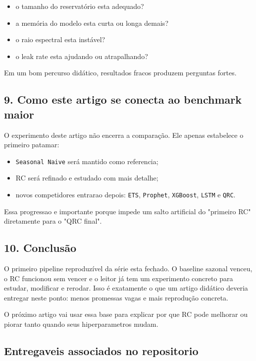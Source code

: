 \documentclass[12pt]{article}
\providecommand{\tightlist}{%
          \setlength{\itemsep}{0pt}\setlength{\parskip}{0pt}}
\begin{document}
\begin{itemize}
\tightlist
\item
  o tamanho do reservatório esta adequado?
\item
  a memória do modelo esta curta ou longa demais?
\item
  o raio espectral esta instável?
\item
  o leak rate esta ajudando ou atrapalhando?
\end{itemize}

Em um bom percurso didático, resultados fracos produzem perguntas fortes.

\subsection{9. Como este artigo se conecta ao benchmark maior}\label{9-como-este-artigo-se-conecta-ao-benchmark-maior}

O experimento deste artigo não encerra a comparação. Ele apenas estabelece o primeiro patamar:

\begin{itemize}
\tightlist
\item
  \texttt{Seasonal\ Naive} será mantido como referencia;
\item
  RC será refinado e estudado com mais detalhe;
\item
  novos competidores entrarao depois: \texttt{ETS}, \texttt{Prophet}, \texttt{XGBoost}, \texttt{LSTM} e \texttt{QRC}.
\end{itemize}

Essa progressao e importante porque impede um salto artificial do "primeiro RC" diretamente para o "QRC final".

\subsection{10. Conclusão}\label{10-conclusuxe3o}

O primeiro pipeline reproduzível da série esta fechado. O baseline sazonal venceu, o RC funcionou sem vencer e o leitor já tem um experimento concreto para estudar, modificar e rerodar. Isso é exatamente o que um artigo didático deveria entregar neste ponto: menos promessas vagas e mais reprodução concreta.

O próximo artigo vai usar essa base para explicar por que RC pode melhorar ou piorar tanto quando seus hiperparametros mudam.

\subsection{Entregaveis associados no repositorio}\label{entregaveis-associados-no-repositorio}
\end{document}
